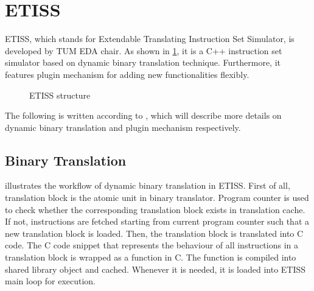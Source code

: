 \section{ETISS}

ETISS, which stands for Extendable Translating Instruction Set Simulator, is developed by TUM EDA chair.
As shown in \cref{fig:etiss_structure}, it is a C++ instruction set simulator based on dynamic binary translation technique. Furthermore, it features plugin mechanism for adding new functionalities flexibly.

\begin{figure}[ht]
    \caption{ETISS structure\cite{ETISS}}
    \label{fig:etiss_structure}
\end{figure}

The following is written according to \cite{ETISS}, which will describe more details on dynamic binary translation and plugin mechanism respectively.

\subsection{Binary Translation}
 illustrates the workflow of dynamic binary translation in ETISS.
First of all, translation block is the atomic unit in binary translator. Program counter is used to check whether the corresponding translation block exists in translation cache.
If not, instructions are fetched starting from current program counter such that a new translation block is loaded. Then, the translation block is translated into C code.
The C code snippet that represents the behaviour of all instructions in a translation block is wrapped as a function in C. The function is compiled into shared library object and cached.
Whenever it is needed, it is loaded into ETISS main loop for execution. 

